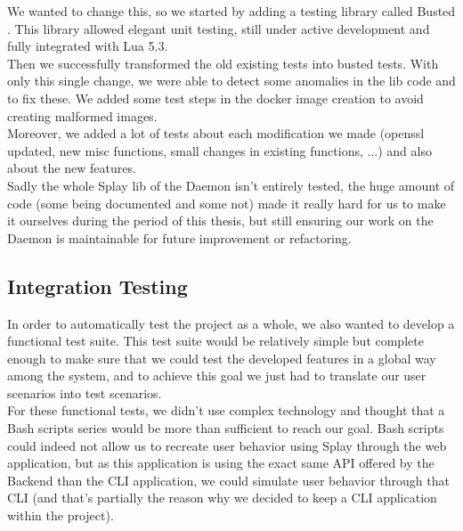 \documentclass{eplmastersthesis}
\begin{document}
        We wanted to change this, so we started by adding a testing library
        called Busted \cite{busted}. This library allowed elegant unit testing,
        still under active development and fully integrated with Lua 5.3.\\
        Then we successfully transformed the old existing tests into busted
        tests. With only this single change, we were able to detect some
        anomalies in the lib code and to fix these. We added some test steps
        in the docker image creation to avoid creating malformed images.\\

        Moreover, we added a lot of tests about each modification we made
        (openssl updated, new misc functions, small changes in existing
        functions, ...) and also about the new features.\\
        Sadly the whole Splay lib of the Daemon isn't entirely tested,
        the huge amount of code (some being documented and some not) made it
        really hard for us to make it ourselves during the period of this
        thesis, but still ensuring our work on the Daemon is maintainable
        for future improvement or refactoring.

      \subsection{Integration Testing}

        In order to automatically test the project as a whole, we also wanted to
        develop a functional test suite. This test suite would be relatively
        simple but complete enough to make sure that we could test the developed
        features in a global way among the system, and to achieve this goal we
        just had to translate our user scenarios into test scenarios.\\

        For these functional tests, we didn't use complex technology and
        thought that a Bash scripts series would be more than sufficient to
        reach our goal. Bash scripts could indeed not allow us to recreate user
        behavior using Splay through the web application, but as this
        application is using the exact same API offered by the Backend than the
        CLI application, we could simulate user behavior through that CLI (and
        that's partially the reason why we decided to keep a CLI application
        within the project).\\
\end{document}
